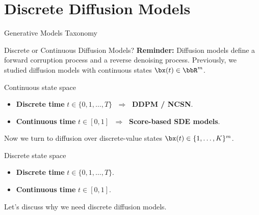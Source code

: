 \documentclass{beamer}
\begin{document}
\section{Discrete Diffusion Models}
\begin{frame}{Generative Models Taxonomy}
\end{frame}
\begin{frame}{Discrete or Continuous Diffusion Models?}
	\textbf{Reminder:} Diffusion models define a forward corruption process and a reverse denoising process.
	Previously, we studied diffusion models with continuous states $\bx(t) \in \bbR^m$.
	\begin{block}{Continuous state space}
		\begin{itemize}
			\item \textbf{Discrete time} $t \in \{0,1,\ldots,T\}$ $\;\Rightarrow\;$ \textbf{DDPM / NCSN}.
			\item \textbf{Continuous time} $t \in [0,1]$ $\;\Rightarrow\;$ \textbf{Score-based SDE models}.
		\end{itemize}
	\end{block}
	\eqpause
	Now we turn to diffusion over discrete-value states $\bx(t) \in \{1, \dots, K\}^m$.
	\begin{block}{Discrete state space}
		\begin{itemize}
			\item \textbf{Discrete time} $t \in \{0,1,\ldots,T\}$.
			\item \textbf{Continuous time} $t \in [0,1]$.
		\end{itemize}
	\end{block}
	Let's discuss why we need discrete diffusion models.
\end{frame}
\end{document}
